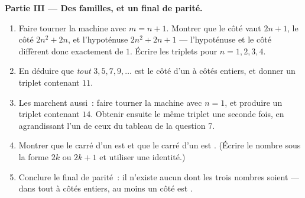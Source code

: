 \begin{problem}[{Devoir maison --- les triangles rectangles à côtés
entiers, et l'identité $(m^2 - n^2)^2 + (2mn)^2 = (m^2 + n^2)^2$ qui
les engendre tous}]
\medskip
\noindent\textbf{Partie III --- Des familles, et un final de
parité.}
\begin{enumerate}[resume]
  \item Faire tourner la machine avec $m = n + 1$. Montrer que le
        côté  vaut $2n + 1$, le côté  $2n^2 + 2n$, et
        l'hypoténuse $2n^2 + 2n + 1$ --- l'hypoténuse et le côté
         diffèrent donc exactement de $1$. Écrire les triplets
        pour $n = 1, 2, 3, 4$.
  \item En déduire que \emph{tout}  $3, 5, 7, 9, \dots$
        est le côté d'un  à côtés entiers, et
        donner un triplet contenant $11$.
  \item Les  marchent aussi~: faire tourner la machine
        avec $n = 1$, et produire un triplet contenant $14$. Obtenir
        ensuite le même triplet une seconde fois, en agrandissant
        l'un de ceux du tableau de la question 7.
  \item Montrer que le carré d'un  est  et que le
        carré d'un  est . (Écrire le nombre sous
        la forme $2k$ ou $2k + 1$ et utiliser une identité.)
  \item Conclure le final de parité~: il n'existe aucun  dont les trois nombres soient  --- dans
        tout  à côtés entiers, au moins un côté
        est .
\end{enumerate}
\end{problem}
